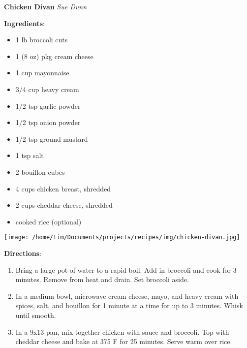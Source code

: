 \documentclass[11pt, twoside, openany]{book}
\begin{document}
\noindent\begin{minipage}[t]{\linewidth}%
{\Large\textbf{Chicken Divan}} \label{chicken-divan}\hfill\textit{Sue Dunn}\\
\noindent\begin{minipage}[t]{0.78\linewidth}%
\textbf{Ingredients}:\vspace{-3mm}
\begin{multicols}{2}
\begin{itemize}\setlength\itemsep{-1mm}
\item 1 lb broccoli cuts
\item 1 (8 oz) pkg cream cheese
\item 1 cup mayonnaise
\item 3/4 cup heavy cream
\item 1/2 tsp garlic powder
\item 1/2 tsp onion powder
\item 1/2 tsp ground mustard
\item 1 tsp salt
\item 2 bouillon cubes
\item 4 cups chicken breast, shredded
\item 2 cups cheddar cheese, shredded
\item cooked rice (optional)
\end{itemize}
\end{multicols}
\end{minipage}
\noindent\begin{minipage}[t]{0.18\linewidth}
\centering \strut\vspace*{-\baselineskip}\newline
\texttt{[image: /home/tim/Documents/projects/recipes/img/chicken-divan.jpg]}\\
\end{minipage}\vspace{3mm}
\textbf{Directions}:
\vspace{-3mm}\begin{enumerate}\setlength\itemsep{-1mm}
\item Bring a large pot of water to a rapid boil. Add in broccoli and cook for 3 minutes. Remove from heat and drain. Set broccoli aside.
\item In a medium bowl, microwave cream cheese, mayo, and heavy cream with spices, salt, and bouillon for 1 minute at a time for up to 3 minutes. Whisk until smooth.
\item In a 9x13 pan, mix together chicken with sauce and broccoli. Top with cheddar cheese and bake at 375 F for 25 minutes. Serve warm over rice.
\end{enumerate}
\end{minipage}\vspace{8mm}
\end{document}
